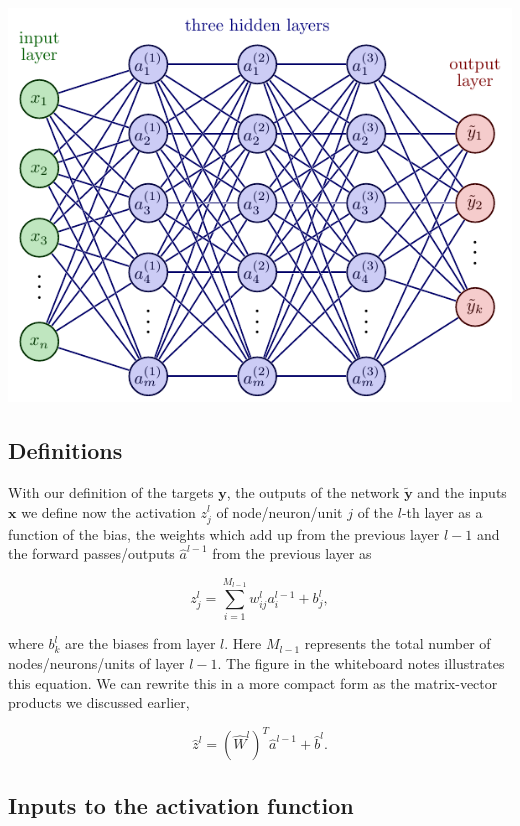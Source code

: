 \documentclass[%
oneside,                 %
final,                   %
10pt]{article}
\begin{document}
\centerline{\includegraphics[width=1.0\linewidth]{figures/nn1.pdf}}

\vspace{6mm}

\subsection{Definitions}

With our definition of the targets $\bm{y}$, the outputs of the
network $\bm{\tilde{y}}$ and the inputs $\bm{x}$ we
define now the activation $z_j^l$ of node/neuron/unit $j$ of the
$l$-th layer as a function of the bias, the weights which add up from
the previous layer $l-1$ and the forward passes/outputs
$\hat{a}^{l-1}$ from the previous layer as

\[
z_j^l = \sum_{i=1}^{M_{l-1}}w_{ij}^la_i^{l-1}+b_j^l,
\]

where $b_k^l$ are the biases from layer $l$.  Here $M_{l-1}$
represents the total number of nodes/neurons/units of layer $l-1$. The
figure in the whiteboard notes illustrates this equation.  We can rewrite this in a more
compact form as the matrix-vector products we discussed earlier,

\[
\hat{z}^l = \left(\hat{W}^l\right)^T\hat{a}^{l-1}+\hat{b}^l.
\]

\subsection{Inputs to the activation function}
\end{document}
